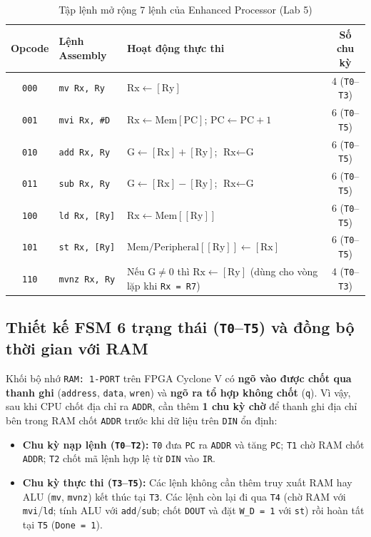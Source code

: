 \documentclass[11pt,a4paper]{article}
\newcommand{\code}[1]{\texttt{\small #1}}
\begin{document}
\begin{table}[H]
  \centering
  \caption{Tập lệnh mở rộng 7 lệnh của Enhanced Processor (Lab 5)}
  \label{tab:lab5_isa}
  \small
  \renewcommand{\arraystretch}{1.12}
  \begin{tabularx}{\linewidth}{@{}c l X c@{}}
    \toprule
    \textbf{Opcode} & \textbf{Lệnh Assembly} & \textbf{Hoạt động thực thi} & \textbf{Số chu kỳ} \\
    \midrule
    \code{000} & \code{mv Rx, Ry}     & $\text{Rx} \leftarrow [\text{Ry}]$ & 4 (\code{T0}--\code{T3}) \\
    \code{001} & \code{mvi Rx, \#D}   & $\text{Rx} \leftarrow \text{Mem}[\text{PC}]$; $\text{PC} \leftarrow \text{PC} + 1$ & 6 (\code{T0}--\code{T5}) \\
    \code{010} & \code{add Rx, Ry}    & $\text{G} \leftarrow [\text{Rx}] + [\text{Ry}]$; $\text{Rx} \leftarrow \text{G}$ & 6 (\code{T0}--\code{T5}) \\
    \code{011} & \code{sub Rx, Ry}    & $\text{G} \leftarrow [\text{Rx}] - [\text{Ry}]$; $\text{Rx} \leftarrow \text{G}$ & 6 (\code{T0}--\code{T5}) \\
    \code{100} & \code{ld Rx, [Ry]}   & $\text{Rx} \leftarrow \text{Mem}[[\text{Ry}]]$ & 6 (\code{T0}--\code{T5}) \\
    \code{101} & \code{st Rx, [Ry]}   & $\text{Mem/Peripheral}[[\text{Ry}]] \leftarrow [\text{Rx}]$ & 6 (\code{T0}--\code{T5}) \\
    \code{110} & \code{mvnz Rx, Ry}   & Nếu $\text{G} \neq 0$ thì $\text{Rx} \leftarrow [\text{Ry}]$ (dùng cho vòng lặp khi \code{Rx = R7}) & 4 (\code{T0}--\code{T3}) \\
    \bottomrule
  \end{tabularx}
\end{table}

\subsection{Thiết kế FSM 6 trạng thái (\code{T0}--\code{T5}) và đồng bộ thời gian với RAM}
Khối bộ nhớ \code{RAM: 1-PORT} trên FPGA Cyclone V có \textbf{ngõ vào được chốt qua thanh ghi} (\code{address}, \code{data}, \code{wren}) và \textbf{ngõ ra tổ hợp không chốt} (\code{q}). Vì vậy, sau khi CPU chốt địa chỉ ra \code{ADDR}, cần thêm \textbf{1 chu kỳ chờ} để thanh ghi địa chỉ bên trong RAM chốt \code{ADDR} trước khi dữ liệu trên \code{DIN} ổn định:
\begin{itemize}
  \item \textbf{Chu kỳ nạp lệnh (\code{T0}--\code{T2}):} \code{T0} đưa \code{PC} ra \code{ADDR} và tăng \code{PC}; \code{T1} chờ RAM chốt \code{ADDR}; \code{T2} chốt mã lệnh hợp lệ từ \code{DIN} vào \code{IR}.
  \item \textbf{Chu kỳ thực thi (\code{T3}--\code{T5}):} Các lệnh không cần thêm truy xuất RAM hay ALU (\code{mv}, \code{mvnz}) kết thúc tại \code{T3}. Các lệnh còn lại đi qua \code{T4} (chờ RAM với \code{mvi}/\code{ld}; tính ALU với \code{add}/\code{sub}; chốt \code{DOUT} và đặt \code{W\_D = 1} với \code{st}) rồi hoàn tất tại \code{T5} (\code{Done = 1}).
\end{itemize}
\end{document}
